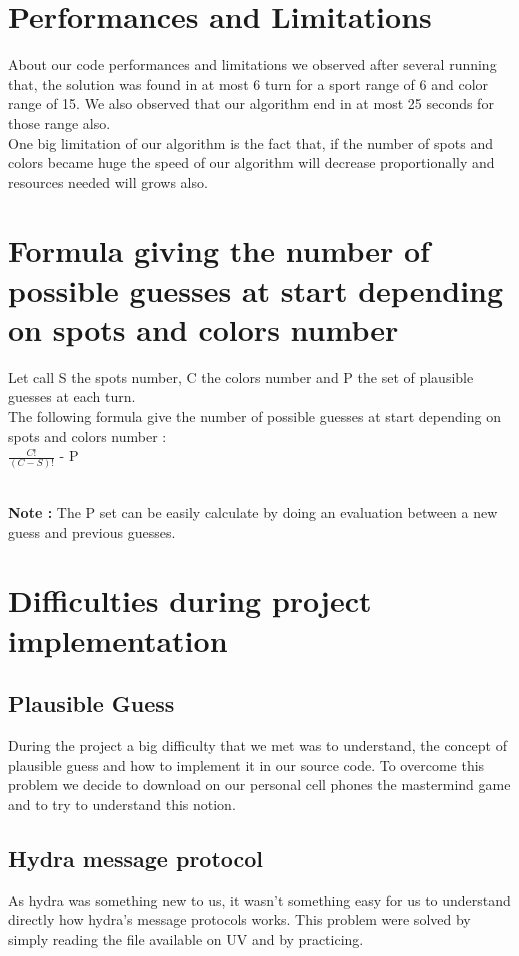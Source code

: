 \section{Performances and Limitations}
About our code performances and limitations we observed after several running that, the solution was found in at most 6 turn for a sport range of 6 and color range of 15. We also observed that our algorithm end in at most 25 seconds for those range also. \\
One big limitation of our algorithm is the fact that, if the number of spots and colors became huge the speed of our algorithm will decrease proportionally and resources needed will grows also. 


\section{Formula giving the number of possible guesses at start depending on spots and 
colors number}
Let call S the spots number, C the colors number and P the set of plausible guesses at each turn. \\
The following formula give the number of possible guesses at start depending on spots and 
colors number : \\
$ \frac{C!}{(C-S)!}$ - P

\\
\textbf{Note :} The P set can be easily calculate by doing an evaluation between a new guess and previous guesses.

\section{Difficulties during project implementation}
\subsection{Plausible Guess}
During the project a big difficulty that we met was to understand, the concept of plausible guess and how to implement it in our source code.  To overcome this problem we decide to download on our personal cell phones the mastermind game and to try to understand this notion.
\subsection{Hydra message protocol}
As hydra was something new to us, it wasn't something easy for us to understand directly how hydra's message protocols works. This problem were solved by simply reading the file available on UV and by practicing. 


